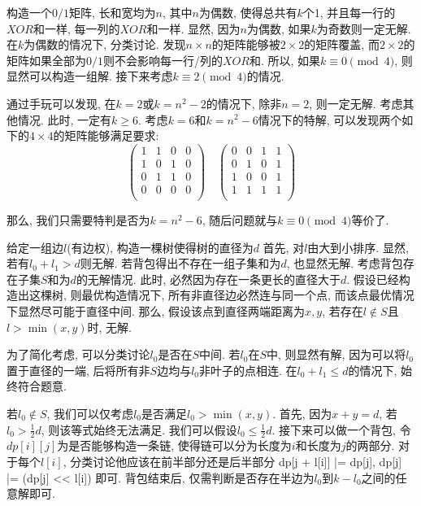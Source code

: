 \prob 构造一个$0/1$矩阵, 长和宽均为$n$, 其中$n$为偶数, 使得总共有$k$个1, 并且每一行的$XOR$和一样, 每一列的$XOR$和一样.
\sol 显然, 因为$n$为偶数, 如果$k$为奇数则一定无解. 在$k$为偶数的情况下, 分类讨论. 发现$n\times n$的矩阵能够被$2 \times 2$的矩阵覆盖, 而$2 \times 2$的矩阵如果全部为$0/1$则不会影响每一行/列的$XOR$和. 所以, 如果$k \equiv 0 \pmod{4}$, 则显然可以构造一组解. 接下来考虑$k \equiv 2 \pmod{4}$的情况.

通过手玩可以发现, 在$k = 2$或$k = n^2 - 2$的情况下, 除非$n=2$, 则一定无解. 考虑其他情况. 此时, 一定有$k \geq 6$. 考虑$k = 6$和$k = n^2 - 6$情况下的特解, 可以发现两个如下的$4 \times 4$的矩阵能够满足要求:
$$
\begin{pmatrix}
1 & 1 & 0 & 0 \\
1 & 0 & 1 & 0 \\
0 & 1 & 1 & 0 \\
0 & 0 & 0 & 0 \\
\end{pmatrix}
\quad
\begin{pmatrix}
0 & 0 & 1 & 1 \\
0 & 1 & 0 & 1 \\
1 & 0 & 0 & 1 \\
1 & 1 & 1 & 1 \\
\end{pmatrix}
$$

那么, 我们只需要特判是否为$k = n^2-6$, 随后问题就与$k \equiv 0 \pmod{4}$等价了.

\prob 给定一组边$l$(有边权), 构造一棵树使得树的直径为$d$
\sol 首先, 对$l$由大到小排序. 显然, 若有$l_0 + l_1 > d$则无解. 若背包得出不存在一组子集和为$d$, 也显然无解. 考虑背包存在子集$S$和为$d$的无解情况. 此时, 必然因为存在一条更长的直径大于$d$. 假设已经构造出这棵树, 则最优构造情况下, 所有非直径边必然连与同一个点, 而该点最优情况下显然尽可能于直径中间. 那么, 假设该点到直径两端距离为$x, y$, 若存在$l \not \in S$且$l > \min(x,y)$时, 无解.

为了简化考虑, 可以分类讨论$l_0$是否在$S$中间. 若$l_0$在$S$中, 则显然有解, 因为可以将$l_0$置于直径的一端, 后将所有非$S$边均与$l_0$非叶子的点相连. 在$l_0 + l_1 \leq d$的情况下, 始终符合题意.

若$l_0 \not \in S$, 我们可以仅考虑$l_0$是否满足$l_0 > \min(x,y)$. 首先, 因为$x + y = d$, 若$l_0 > \frac{1}{2} d$, 则该等式始终无法满足. 我们可以假设$l_0 \leq \frac{1}{2}d$. 接下来可以做一个背包, 令$dp[i][j]$为是否能够构造一条链, 使得链可以分为长度为$i$和长度为$j$的两部分. 对于每个$l[i]$, 分类讨论他应该在前半部分还是后半部分 dp[j + l[i]] |= dp[j], dp[j] |= (dp[j] << l[i]) 即可. 背包结束后, 仅需判断是否存在半边为$l_0$到$k - l_0$之间的任意解即可.